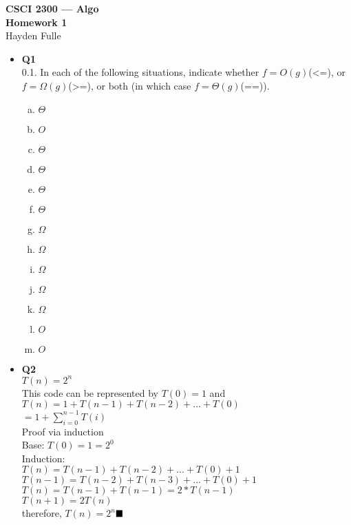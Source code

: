 \documentclass[11pt]{article}
\begin{document}
\thispagestyle{empty}   %

\begin{center}
\large
\textbf{CSCI 2300 --- Algo \\
Homework 1}
\\Hayden Fulle
\end{center}

\begin{itemize}

\item \textbf{Q1} 
\\0.1. In each of the following situations, indicate whether $f = O(g)$(<=), or $f =\Omega (g)$(>=), or
both (in which case $f = \Theta(g)$(==)).
\begin{enumerate}[(a)]
\item $\Theta$
\item $O$
\item $\Theta$
\item $\Theta$
\item $\Theta$
\item $\Theta$
\item $\Omega$
\item $\Omega$
\item $\Omega$
\item $\Omega$
\item $\Omega$
\item $O$
\item $O$
\end{enumerate}

\vspace{0.1in}

\item \textbf{Q2} 
\\$T(n)=2^n$
\\This code can be represented by $T(0)=1$ and $T(n)=1+T(n-1)+T(n-2)+...+T(0)$
\\$=1+\sum_{i=0}^{n-1} T(i)$
\\Proof via induction
\\Base: $T(0)=1=2^0$
\\Induction: 
\\$T(n)=T(n-1)+T(n-2)+...+T(0)+1$
\\$T(n-1)=T(n-2)+T(n-3)+...+T(0)+1$
\\$T(n)=T(n-1)+T(n-1)=2*T(n-1)$
\\$T(n+1)=2T(n)$
\\therefore, $T(n)=2^n$$\hfill{\blacksquare}$

\vspace{0.1in}


\end{itemize}
\end{document}
